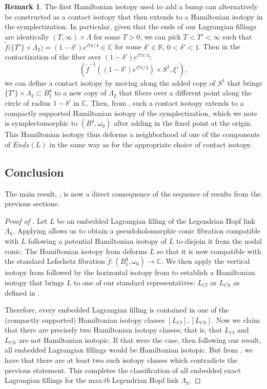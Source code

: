 \documentclass[10pt]{amsart}
\theoremstyle{plain}
\theoremstyle{definition}
\newtheorem{remark}[thm]{Remark}
\numberwithin{equation}{section}
\newcommand{\R}{\mathbb{R}}
\newcommand{\C}{\mathbb{C}}
\newcommand{\sse}{\subset}
\begin{document}
\begin{remark}
The first Hamiltonian isotopy used to add a bump can alternatively be constructed as a contact isotopy that then extends to a Hamiltonian isotopy in the symplectization. In particular, given that the ends of our Lagrangian fillings are identically $(T,\infty)\times \Lambda$ for some $T>0$, we can pick $T<T'<\infty$ such that $\tilde{f}\big(\{T'\}\times \Lambda_2\big) = (1-\delta')e^{i7\pi/4}\in \C$ for some $\delta'\in \R$, $0<\delta'<1$. Then in the contactization of the fiber over $(1-\delta')e^{i7\pi/4}$: 
$$(\tilde{f}^{-1}((1-\delta')e^{i7\pi/4})\times S^1,\xi'),$$
we can define a contact isotopy by moving along the added copy of $S^1$ that brings $\{T'\}\times \Lambda_2\sse B^4_1$ to a new copy of $\Lambda_2$ that fibers over a different point along the circle of radius $1-\delta'$ in $\C$. Then, from \cite[Proposition 3.1]{casals17_ExoticDisks}, such a contact isotopy extends to a compactly supported Hamiltonian isotopy of the symplectization, which we note is symplectomorphic to $(B^4,\omega_0)$ after adding in the fixed point at the origin. This Hamiltonian isotopy thus deforms a neighborhood of one of the components of $Ends(L)$ in the same way as  for the appropriate choice of contact isotopy.
\end{remark}

\subsection{Conclusion}
The main result, , is now a direct consequence of the sequence of results from the previous sections.
\begin{proof}[Proof of ] Let $L$ be an embedded Lagrangian filling of the Legendrian Hopf link $\Lambda_h$. Applying  allows us to obtain a pseudoholomorphic conic fibration compatible with $L$ following a potential Hamiltonian isotopy of $L$ to disjoin it from the nodal conic. The Hamiltonian isotopy from  deforms $L$ so that it is now compatible with the standard Lefschetz fibration $\tilde{f}:(B^4_1,\omega_0)\to \C$. We then apply the vertical isotopy from  followed by the horizontal isotopy from  to establish a Hamiltonian isotopy that brings $L$ to one of our standard representatives: $L_{Cl}$ or $L_{Ch}$ as defined in .

Therefore, every embedded Lagrangian filling is contained in one of the (compactly supported) Hamiltonian isotopy classes $[L_{Cl}],[L_{Ch}]$. Now we claim that there are precisely two Hamiltonian isotopy classes; that is, that $L_{Cl}$ and $L_{Ch}$ are not Hamiltonian isotopic. If that were the case, then following our result, all embedded Lagrangian fillings would be Hamiltonian isotopic. But from , we have that there are at least two such isotopy classes which contradicts the previous statement. This completes the classification of all embedded exact Lagrangian fillings for the max-$tb$ Legendrian Hopf link $\Lambda_h$.
\end{proof}

\color{black}
%


\end{document}
